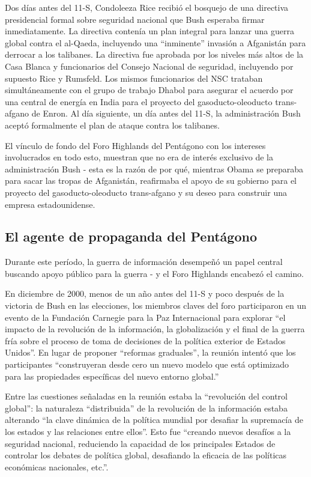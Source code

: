 \documentclass[10pt,a5paper,twoside,spanish,]{book}
\begin{document}
Dos días antes del 11-S, Condoleeza Rice recibió el bosquejo de una
directiva presidencial formal sobre seguridad nacional que Bush esperaba
firmar inmediatamente. La directiva contenía un plan integral para
lanzar una guerra global contra el al-Qaeda, incluyendo una
``inminente'' invasión a Afganistán para derrocar a los talibanes. La
directiva fue aprobada por los niveles más altos de la Casa Blanca y
funcionarios del Consejo Nacional de seguridad, incluyendo por supuesto
Rice y Rumsfeld. Los mismos funcionarios del NSC trataban
simultáneamente con el grupo de trabajo Dhabol para asegurar el acuerdo
por una central de energía en India para el proyecto del
gasoducto-oleoducto trans-afgano de Enron. Al día siguiente, un día
antes del 11-S, la administración Bush aceptó formalmente el plan de
ataque contra los talibanes.

El vínculo de fondo del Foro Highlands del Pentágono con los intereses
involucrados en todo esto, muestran que no era de interés exclusivo de
la administración Bush - esta es la razón de por qué, mientras Obama se
preparaba para sacar las tropas de Afganistán, reafirmaba el apoyo de su
gobierno para el proyecto del gasoducto-oleoducto trans-afgano y su
deseo para construir una empresa estadounidense.

\subsection{El agente de propaganda del
Pentágono}\label{el-agente-de-propaganda-del-pentuxe1gono}

Durante este período, la guerra de información desempeñó un papel
central buscando apoyo público para la guerra - y el Foro Highlands
encabezó el camino.

En diciembre de 2000, menos de un año antes del 11-S y poco después de
la victoria de Bush en las elecciones, los miembros claves del foro
participaron en un evento de la Fundación Carnegie para la Paz
Internacional para explorar ``el impacto de la revolución de la
información, la globalización y el final de la guerra fría sobre el
proceso de toma de decisiones de la política exterior de Estados
Unidos''. En lugar de proponer ``reformas graduales'', la reunión
intentó que los participantes ``construyeran desde cero un nuevo modelo
que está optimizado para las propiedades específicas del nuevo entorno
global.''

Entre las cuestiones señaladas en la reunión estaba la ``revolución del
control global'': la naturaleza ``distribuida'' de la revolución de la
información estaba alterando ``la clave dinámica de la política mundial
por desafiar la supremacía de los estados y las relaciones entre
ellos''. Esto fue ``creando nuevos desafíos a la seguridad nacional,
reduciendo la capacidad de los principales Estados de controlar los
debates de política global, desafiando la eficacia de las políticas
económicas nacionales, etc.''.
\end{document}
